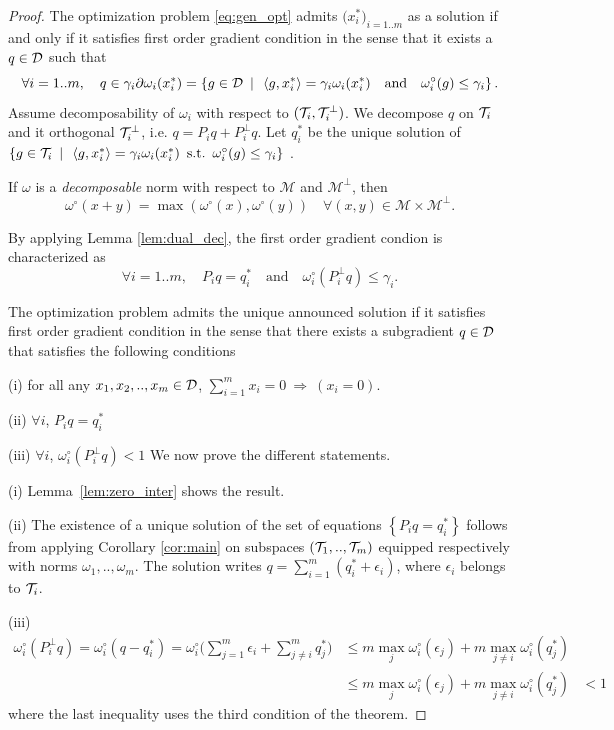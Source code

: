 \documentclass{article}
\begin{document}
\begin{proof}
The optimization problem \ref{eq:gen_opt} admits $\big(x_{i}^*\big)_{i=1..m}$ as a solution if and only if it satisfies first order gradient condition in the sense that it exists a $q\in\mathcal{D}$ such that
$$
\forall{i}=1..m, \quad q\in\gamma_{i}\partial\omega_{i}(x_i^*)=\left\lbrace g\in\mathcal{D}  \enspace|\enspace \left\langle g,x_i^* \right\rangle = \gamma_i\omega_{i}(x_i^*) \quad \text{and} \quad \omega_{i}^{\circ}(g)\leq \gamma_i  \right\rbrace.
$$
Assume decomposability of $\omega_i$ with respect to $(\mathcal{T}_i,\mathcal{T}_i^{\perp})$. We decompose $q$ on  $\mathcal{T}_i$ and it orthogonal $\mathcal{T}_i^{\perp}$, i.e. $q=P_i q+P_i^{\perp} q$. 
Let $q_i^*$ be the unique solution of $\left\lbrace g \in \mathcal{T}_i \enspace|\enspace \left\langle g,x_i^* \right\rangle = \gamma_i\omega_{i}(x_i^*) \enspace\text{s.t.}\enspace  \omega_{i}^{\circ}(g)\leq \gamma_i\right\rbrace$ . 
\begin{lemma}
\label{lem:dual_dec}
If $\omega$ is a \emph{decomposable} norm with respect to $\mathcal{M}$ and $\mathcal{M}^{\perp}$, then
$$
\omega^{\circ}(x+y)=\max(\omega^{\circ}(x),\omega^{\circ}(y))  \quad \forall (x,y)\in\mathcal{M}\times\mathcal{M}^{\perp}.
$$
\end{lemma}

By applying Lemma \ref{lem:dual_dec}, the first order gradient condion is characterized as 
$$
\forall{i}=1..m, \quad P_i q=q_i^* \quad \text{and} \quad \omega_i^\circ(P_i^{\perp} q)\leq \gamma_i.
$$

 The optimization problem admits the unique announced solution if it satisfies first order gradient condition in the sense that there exists a subgradient $q \in \mathcal{D}$ that satisfies the following conditions
\BET
\item[(i)] for all any $x_{1},x_{2},..,x_{m}\in \mathcal{D}$, $\sum_{i=1}^{m} x_{i}=0 \: \Rightarrow \: (x_{i}=0)$. 
\item[(ii)] $\forall i$, $P_i q = q_i^*$
\item[(iii)]$\forall i$, $\omega_{i}^{\circ}(P_i^{\perp} q)<1$
\EET
We now prove the different statements. 
\BET
\item[(i)]  Lemma~\ref{lem:zero_inter} shows the result. 
\item[(ii)]  The existence of a unique solution of the set of equations $\left\lbrace P_i q = q_i^* \right\rbrace$ follows from applying Corollary \ref{cor:main} on subspaces $\left(\mathcal{T}_1,..,\mathcal{T}_m\right)$ equipped respectively with norms $\omega_1,.., \omega_m$. The solution writes $q=\sum_{i=1}^m(q_i^*+\epsilon_i)$, where $\epsilon_i$ belongs to $\mathcal{T}_i$.
\item[(iii)]  
\begin{align*}
\omega_{i}^{\circ}(P_i^{\perp} q) = \omega_{i}^{\circ}(q-q_i^*) = \omega_{i}^{\circ}\big(\sum_{j=1}^m\epsilon_i + \sum_{j\neq i}^m q_j^*\big) 
&\leq m \max_j \omega_{i}^{\circ}(\epsilon_j) + m  \max_{j\neq i} \omega_{i}^{\circ}(q_j^*) \\
&\leq m \max_j \omega_{i}^{\circ}(\epsilon_j) + m  \max_{j\neq i} \omega_{i}^{\circ}(q_j^*)
& < 1 
\end{align*}
where the last inequality uses the third condition of the theorem.
\EET
\end{proof}
\end{document}
